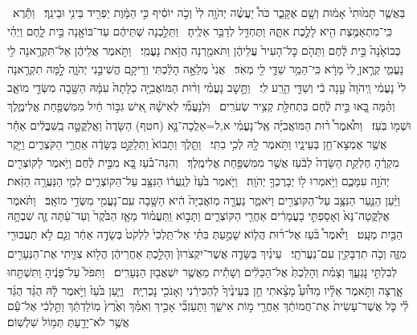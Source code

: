 \documentclass[12pt]{article}
\newcommand{\loc}[1]{\textsuperscript{\locf{#1}}}
\begin{document}
{\loc{ יז}~}‏בַּאֲשֶׁ֤ר תָּמ֙וּתִי֙ אָמ֔וּת וְשָׁ֖ם אֶקָּבֵ֑ר כֹּה֩ יַעֲשֶׂ֨ה יְהֹוָ֥ה לִי֙ וְכֹ֣ה יוֹסִ֔יף כִּ֣י הַמָּ֔וֶת יַפְרִ֖יד בֵּינִ֥י וּבֵינֵֽךְ׃
{\loc{ יח}~}‏וַתֵּ֕רֶא כִּֽי־מִתְאַמֶּ֥צֶת הִ֖יא לָלֶ֣כֶת אִתָּ֑הּ וַתֶּחְדַּ֖ל לְדַבֵּ֥ר אֵלֶֽיהָ׃
{\loc{ יט}~}‏וַתֵּלַ֣כְנָה שְׁתֵּיהֶ֔ם עַד־בּוֹאָ֖נָה בֵּ֣ית לָ֑חֶם וַיְהִ֗י כְּבוֹאָ֙נָה֙ בֵּ֣ית לֶ֔חֶם וַתֵּהֹ֤ם כׇּל־הָעִיר֙ עֲלֵיהֶ֔ן וַתֹּאמַ֖רְנָה הֲזֹ֥את נָעֳמִֽי׃
{\loc{ כ}~}‏וַתֹּ֣אמֶר אֲלֵיהֶ֔ן אַל־תִּקְרֶ֥אנָה לִ֖י נָעֳמִ֑י קְרֶ֤אןָ לִי֙ מָרָ֔א כִּֽי־הֵמַ֥ר שַׁדַּ֛י לִ֖י מְאֹֽד׃
{\loc{ כא}~}‏אֲנִי֙ מְלֵאָ֣ה הָלַ֔כְתִּי וְרֵיקָ֖ם הֱשִׁיבַ֣נִי יְהֹוָ֑ה לָ֣מָּה תִקְרֶ֤אנָה לִי֙ נָעֳמִ֔י וַֽיהֹוָה֙ עָ֣נָה בִ֔י וְשַׁדַּ֖י הֵ֥רַֽע לִֽי׃
{\loc{ כב}~}‏וַתָּ֣שׇׁב נָעֳמִ֗י וְר֨וּת הַמּוֹאֲבִיָּ֤ה כַלָּתָהּ֙ עִמָּ֔הּ הַשָּׁ֖בָה מִשְּׂדֵ֣י מוֹאָ֑ב וְהֵ֗מָּה בָּ֚אוּ בֵּ֣ית לֶ֔חֶם בִּתְחִלַּ֖ת קְצִ֥יר שְׂעֹרִֽים׃
\ledsidenote{{\loc{ב פרק}}}
{\loc{ א}~}‏וּֽלְנָעֳמִ֞י  לְאִישָׁ֗הּ אִ֚ישׁ גִּבּ֣וֹר חַ֔יִל מִמִּשְׁפַּ֖חַת אֱלִימֶ֑לֶךְ וּשְׁמ֖וֹ בֹּֽעַז׃
{\loc{ ב}~}‏וַתֹּ֩אמֶר֩ ר֨וּת הַמּוֹאֲבִיָּ֜ה אֶֽל־נָעֳמִ֗י א,ל=אֵלֲכָה־נָּ֤א (חטף) הַשָּׂדֶה֙ וַאֲלַקֳּטָ֣ה בַֽשִּׁבֳּלִ֔ים אַחַ֕ר אֲשֶׁ֥ר אֶמְצָא־חֵ֖ן בְּעֵינָ֑יו וַתֹּ֥אמֶר לָ֖הּ לְכִ֥י בִתִּֽי׃
{\loc{ ג}~}‏וַתֵּ֤לֶךְ וַתָּבוֹא֙ וַתְּלַקֵּ֣ט בַּשָּׂדֶ֔ה אַחֲרֵ֖י הַקֹּצְרִ֑ים וַיִּ֣קֶר מִקְרֶ֔הָ חֶלְקַ֤ת הַשָּׂדֶה֙ לְבֹ֔עַז אֲשֶׁ֖ר מִמִּשְׁפַּ֥חַת אֱלִימֶֽלֶךְ׃
{\loc{ ד}~}‏וְהִנֵּה־בֹ֗עַז בָּ֚א מִבֵּ֣ית לֶ֔חֶם וַיֹּ֥אמֶר לַקּוֹצְרִ֖ים יְהֹוָ֣ה עִמָּכֶ֑ם וַיֹּ֥אמְרוּ ל֖וֹ יְבָרֶכְךָ֥ יְהֹוָֽה׃
{\loc{ ה}~}‏וַיֹּ֤אמֶר בֹּ֙עַז֙ לְנַֽעֲר֔וֹ הַנִּצָּ֖ב עַל־הַקּוֹצְרִ֑ים לְמִ֖י הַנַּעֲרָ֥ה הַזֹּֽאת׃
{\loc{ ו}~}‏וַיַּ֗עַן הַנַּ֛עַר הַנִּצָּ֥ב עַל־הַקּוֹצְרִ֖ים וַיֹּאמַ֑ר נַעֲרָ֤ה מֽוֹאֲבִיָּה֙ הִ֔יא הַשָּׁ֥בָה עִֽם־נָעֳמִ֖י מִשְּׂדֵ֥י מוֹאָֽב׃
{\loc{ ז}~}‏וַתֹּ֗אמֶר אֲלַקֳּטָה־נָּא֙ וְאָסַפְתִּ֣י בָעֳמָרִ֔ים אַחֲרֵ֖י הַקּוֹצְרִ֑ים וַתָּב֣וֹא וַֽתַּעֲמ֗וֹד מֵאָ֤ז הַבֹּ֙קֶר֙ וְעַד־עַ֔תָּה זֶ֛ה שִׁבְתָּ֥הּ הַבַּ֖יִת מְעָֽט׃
{\loc{ ח}~}‏וַיֹּ֩אמֶר֩ בֹּ֨עַז אֶל־ר֜וּת הֲל֧וֹא שָׁמַ֣עַתְּ בִּתִּ֗י אַל־תֵּֽלְכִי֙ לִלְקֹט֙ בְּשָׂדֶ֣ה אַחֵ֔ר וְגַ֛ם לֹ֥א תַעֲבוּרִ֖י מִזֶּ֑ה וְכֹ֥ה תִדְבָּקִ֖ין עִם־נַעֲרֹתָֽי׃
{\loc{ ט}~}‏עֵינַ֜יִךְ בַּשָּׂדֶ֤ה אֲשֶׁר־יִקְצֹרוּן֙ וְהָלַ֣כְתְּ אַחֲרֵיהֶ֔ן הֲל֥וֹא צִוִּ֛יתִי אֶת־הַנְּעָרִ֖ים לְבִלְתִּ֣י נׇגְעֵ֑ךְ וְצָמִ֗ת וְהָלַכְתְּ֙ אֶל־הַכֵּלִ֔ים וְשָׁתִ֕ית מֵאֲשֶׁ֥ר יִשְׁאֲב֖וּן הַנְּעָרִֽים׃
{\loc{ י}~}‏וַתִּפֹּל֙ עַל־פָּנֶ֔יהָ וַתִּשְׁתַּ֖חוּ אָ֑רְצָה וַתֹּ֣אמֶר אֵלָ֗יו מַדּ֩וּעַ֩ מָצָ֨אתִי חֵ֤ן בְּעֵינֶ֙יךָ֙ לְהַכִּירֵ֔נִי וְאָנֹכִ֖י נׇכְרִיָּֽה׃
{\loc{ יא}~}‏וַיַּ֤עַן בֹּ֙עַז֙ וַיֹּ֣אמֶר לָ֔הּ הֻגֵּ֨ד הֻגַּ֜ד לִ֗י כֹּ֤ל אֲשֶׁר־עָשִׂית֙ אֶת־חֲמוֹתֵ֔ךְ אַחֲרֵ֖י מ֣וֹת אִישֵׁ֑ךְ וַתַּעַזְבִ֞י אָבִ֣יךְ וְאִמֵּ֗ךְ וְאֶ֙רֶץ֙ מֽוֹלַדְתֵּ֔ךְ וַתֵּ֣לְכִ֔י אֶל־עַ֕ם אֲשֶׁ֥ר לֹא־יָדַ֖עַתְּ תְּמ֥וֹל שִׁלְשֽׁוֹם׃
\end{document}
